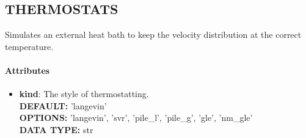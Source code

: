 \subsection{THERMOSTATS}
\label{THERMOSTATS}
Simulates an external heat bath to keep the velocity distribution at the correct temperature.
\paragraph{Attributes}
 \begin{itemize}
\item {\bf kind}:
 The style of thermostatting.
{\\ \bf DEFAULT: }'langevin'
{\\ \bf OPTIONS: }'langevin', 'svr', 'pile\_l', 'pile\_g', 'gle', 'nm\_gle'
{\\ \bf DATA TYPE: }str
\end{itemize}
 
